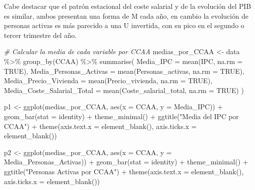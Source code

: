 \documentclass[
]{article}
\newenvironment{Shaded}{\begin{snugshade}}{\end{snugshade}}
\newcommand{\AttributeTok}[1]{\textcolor[rgb]{0.77,0.63,0.00}{#1}}
\newcommand{\CommentTok}[1]{\textcolor[rgb]{0.56,0.35,0.01}{\textit{#1}}}
\newcommand{\ConstantTok}[1]{\textcolor[rgb]{0.00,0.00,0.00}{#1}}
\newcommand{\FunctionTok}[1]{\textcolor[rgb]{0.00,0.00,0.00}{#1}}
\newcommand{\NormalTok}[1]{#1}
\newcommand{\OtherTok}[1]{\textcolor[rgb]{0.56,0.35,0.01}{#1}}
\newcommand{\SpecialCharTok}[1]{\textcolor[rgb]{0.00,0.00,0.00}{#1}}
\newcommand{\StringTok}[1]{\textcolor[rgb]{0.31,0.60,0.02}{#1}}
\begin{document}
Cabe destacar que el patrón estacional del coste salarial y de la
evolución del PIB es similar, ambos presentan una forma de M cada año,
en cambio la evolución de personas activas es más parecido a una U
invertida, con su pico en el segundo o tercer trimestre del año.

\begin{Shaded}
\begin{Highlighting}[]
\CommentTok{\# Calcular la media de cada variable por CCAA}
\NormalTok{medias\_por\_CCAA }\OtherTok{\textless{}{-}}\NormalTok{ data }\SpecialCharTok{\%\textgreater{}\%}
  \FunctionTok{group\_by}\NormalTok{(CCAA) }\SpecialCharTok{\%\textgreater{}\%}
  \FunctionTok{summarise}\NormalTok{(}
    \AttributeTok{Media\_IPC =} \FunctionTok{mean}\NormalTok{(IPC, }\AttributeTok{na.rm =} \ConstantTok{TRUE}\NormalTok{),}
    \AttributeTok{Media\_Personas\_Activas =} \FunctionTok{mean}\NormalTok{(Personas\_activas, }\AttributeTok{na.rm =} \ConstantTok{TRUE}\NormalTok{),}
    \AttributeTok{Media\_Precio\_Vivienda =} \FunctionTok{mean}\NormalTok{(Precio\_vivienda, }\AttributeTok{na.rm =} \ConstantTok{TRUE}\NormalTok{),}
    \AttributeTok{Media\_Coste\_Salarial\_Total =} \FunctionTok{mean}\NormalTok{(Coste\_salarial\_total, }\AttributeTok{na.rm =} \ConstantTok{TRUE}\NormalTok{)}
\NormalTok{  )}

\NormalTok{p1 }\OtherTok{\textless{}{-}} \FunctionTok{ggplot}\NormalTok{(medias\_por\_CCAA, }\FunctionTok{aes}\NormalTok{(}\AttributeTok{x =}\NormalTok{ CCAA, }\AttributeTok{y =}\NormalTok{ Media\_IPC)) }\SpecialCharTok{+}
  \FunctionTok{geom\_bar}\NormalTok{(}\AttributeTok{stat =} \StringTok{\textquotesingle{}identity\textquotesingle{}}\NormalTok{) }\SpecialCharTok{+}
  \FunctionTok{theme\_minimal}\NormalTok{() }\SpecialCharTok{+}
  \FunctionTok{ggtitle}\NormalTok{(}\StringTok{"Media del IPC por CCAA"}\NormalTok{) }\SpecialCharTok{+}
  \FunctionTok{theme}\NormalTok{(}\AttributeTok{axis.text.x =} \FunctionTok{element\_blank}\NormalTok{(), }
        \AttributeTok{axis.ticks.x =} \FunctionTok{element\_blank}\NormalTok{())}


\NormalTok{p2 }\OtherTok{\textless{}{-}} \FunctionTok{ggplot}\NormalTok{(medias\_por\_CCAA, }\FunctionTok{aes}\NormalTok{(}\AttributeTok{x =}\NormalTok{ CCAA, }\AttributeTok{y =}\NormalTok{ Media\_Personas\_Activas)) }\SpecialCharTok{+}
  \FunctionTok{geom\_bar}\NormalTok{(}\AttributeTok{stat =} \StringTok{\textquotesingle{}identity\textquotesingle{}}\NormalTok{) }\SpecialCharTok{+}
  \FunctionTok{theme\_minimal}\NormalTok{() }\SpecialCharTok{+}
  \FunctionTok{ggtitle}\NormalTok{(}\StringTok{"Personas Activas por CCAA"}\NormalTok{) }\SpecialCharTok{+}
  \FunctionTok{theme}\NormalTok{(}\AttributeTok{axis.text.x =} \FunctionTok{element\_blank}\NormalTok{(), }
        \AttributeTok{axis.ticks.x =} \FunctionTok{element\_blank}\NormalTok{())}


\end{Highlighting}
\end{Shaded}
\end{document}
